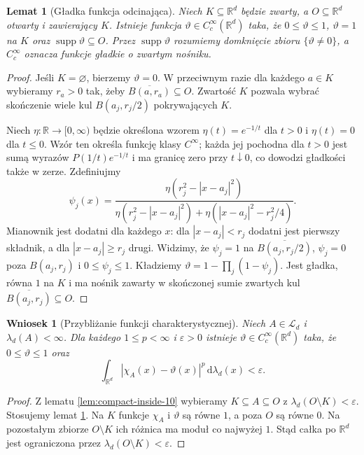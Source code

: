 \documentclass[11pt,a4paper,oneside]{book}
\numberwithin{equation}{chapter}
\theoremstyle{plain}
\newtheorem{lemat}[twierdzenie]{Lemat}
\newtheorem{wniosek}[twierdzenie]{Wniosek}
\theoremstyle{definition}
\theoremstyle{remark}
\begin{document}
\begin{lemat}[Gładka funkcja odcinająca]
\label{lem:smooth-cutoff-10}
Niech $K\subseteq\mathbb R^d$ będzie zwarty,
a $O\subseteq\mathbb R^d$ otwarty i zawierający $K$.
Istnieje funkcja $\vartheta\in C_c^\infty(\mathbb R^d)$
taka, że $0\le\vartheta\le1$, $\vartheta=1$ na $K$
oraz $\operatorname{supp}\vartheta\subseteq O$.
Przez $\operatorname{supp}\vartheta$ rozumiemy domknięcie
zbioru $\{\vartheta\ne0\}$, a $C_c^\infty$ oznacza
funkcje gładkie o zwartym nośniku.
\end{lemat}
\begin{proof}
Jeśli $K=\varnothing$, bierzemy $\vartheta=0$.
W przeciwnym razie dla każdego $a\in K$ wybieramy
$r_a>0$ tak, żeby $\overline{B(a,r_a)}\subseteq O$.
Zwartość $K$ pozwala wybrać skończenie wiele
kul $B(a_j,r_j/2)$ pokrywających $K$.

Niech $\eta:\mathbb R\to[0,\infty)$ będzie określona
wzorem $\eta(t)=e^{-1/t}$ dla $t>0$ i $\eta(t)=0$
dla $t\le0$. Wzór ten określa funkcję klasy
$C^\infty$; każda jej pochodna dla $t>0$ jest
sumą wyrazów $P(1/t)e^{-1/t}$ i ma granicę zero
przy $t\downarrow0$, co dowodzi gładkości także
w zerze. Zdefiniujmy
\[
\psi_j(x)=
\frac{\eta(r_j^2-|x-a_j|^2)}
{\eta(r_j^2-|x-a_j|^2)+
 \eta(|x-a_j|^2-r_j^2/4)}.
\]
Mianownik jest dodatni dla każdego $x$:
dla $|x-a_j|<r_j$ dodatni jest pierwszy składnik,
a dla $|x-a_j|\ge r_j$ drugi. Widzimy, że
$\psi_j=1$ na $\overline{B(a_j,r_j/2)}$,
$\psi_j=0$ poza $B(a_j,r_j)$ i
$0\le\psi_j\le1$.
Kładziemy $\vartheta=1-\prod_j(1-\psi_j)$.
Jest gładka, równa $1$ na $K$ i ma nośnik zawarty
w skończonej sumie zwartych kul
$\overline{B(a_j,r_j)}\subseteq O$.
\end{proof}

\begin{wniosek}[Przybliżanie funkcji charakterystycznej]
\label{cor:indicator-smooth-10}
Niech $A\in\mathcal L_d$ i $\lambda_d(A)<\infty$.
Dla każdego $1\le p<\infty$ i $\varepsilon>0$
istnieje $\vartheta\in C_c^\infty(\mathbb R^d)$ taka,
że $0\le\vartheta\le1$ oraz
\begin{equation}\label{eq:indicator-smooth-10}
\int_{\mathbb R^d}|\chi_A(x)-\vartheta(x)|^p
\,\mathrm d\lambda_d(x)<\varepsilon.
\end{equation}
\end{wniosek}
\begin{proof}
Z lematu \ref{lem:compact-inside-10} wybieramy
$K\subseteq A\subseteq O$ z
$\lambda_d(O\setminus K)<\varepsilon$.
Stosujemy lemat \ref{lem:smooth-cutoff-10}.
Na $K$ funkcje $\chi_A$ i $\vartheta$ są równe $1$,
a poza $O$ są równe $0$. Na pozostałym zbiorze
$O\setminus K$ ich różnica ma moduł co najwyżej $1$.
Stąd całka po $\mathbb R^d$ jest ograniczona przez
$\lambda_d(O\setminus K)<\varepsilon$.
\end{proof}
\end{document}
